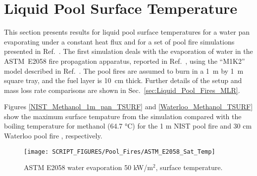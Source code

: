 %
%

\clearpage

\section{Liquid Pool Surface Temperature}
\label{sec:Liquid_Pool_Surf_Temp}

This section presents results for liquid pool surface temperatures for a water pan evaporating under a constant heat flux and for a set of pool fire simulations presented in Ref.~\cite{Sikanen:2016}.  The first simulation deals with the evaporation of water in the ASTM~E2058 fire propagation apparatus, reported in Ref.~\cite{SFPE:Tewarson}, using the ``M1K2'' model described in Ref.~\cite{Sikanen:2016}. The pool fires are assumed to burn in a 1~m by 1~m square tray, and the fuel layer is 10~cm thick.  Further details of the setup and mass loss rate comparisons are shown in Sec.~\ref{sec:Liquid_Pool_Fires_MLR}.

Figures \ref{NIST_Methanol_1m_pan_TSURF} and \ref{Waterloo_Methanol_TSURF} show the maximum surface tempature from the simulation compared with the boiling temperature for methanol (64.7 \si{\degreeCelsius}) for the 1 m NIST pool fire  \cite{Sung:TN2019} and 30 cm Waterloo pool fire \cite{Weckman:CF1996}, respectively.

\begin{figure}[!h]
\centering
\texttt{[image: SCRIPT\_FIGURES/Pool\_Fires/ASTM\_E2058\_Sat\_Temp]}
\caption[ASTM E2058 water evaporation 50 kW/m$^2$, surface temperature]{ASTM E2058 water evaporation 50 kW/m$^2$, surface temperature.}
\label{ASTM_E2058_Water_Evap}
\end{figure}

